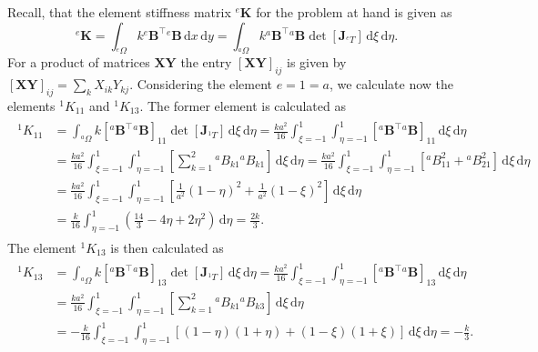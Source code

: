 \documentclass[a4paper,11pt]{article}
\numberwithin{equation}{section}
\newcommand\matr[1]{\ensuremath{\boldsymbol{\mathbf{#1}}}}
\begin{document}
{Recall, that the element stiffness matrix ${}^e \matr{K}$ for the problem at hand is given as \begin{equation}
	{}^e \matr{K} = \int_{{}^e \Omega} k {}^e\matr{B}^\top {}^e \matr{B}\,\mathrm{d}x\,\mathrm{d}y = \int_{{}^a\Omega} k {}^a \matr{B}^\top {}^a\matr{B} \det\left[\matr{J}_{{}^e T}\right]\,\mathrm{d}\xi\,\mathrm{d}\eta.
\end{equation}
For a product of matrices $\matr{X}\matr{Y}$ the entry $[\matr{X}\matr{Y}]_{ij}$ is given by $[\matr{X}\matr{Y}]_{ij} = \sum_k X_{ik}Y_{kj}$. Considering the element $e=1=a$, we calculate now the elements ${}^1 K_{11}$ and ${}^1 K_{13}$. The former element is calculated as \begin{align}
	\begin{aligned}
		{}^1 K_{11} &= \int_{{}^a\Omega}k \left[{}^a \matr{B}^\top {}^a\matr{B}\right]_{11}\det\left[\matr{J}_{{}^1 T}\right]\,\mathrm{d}\xi\,\mathrm{d}\eta = \frac{ka^2}{16}\int_{\xi=-1}^{1}\int_{\eta=-1}^{1}\left[{}^a \matr{B}^\top {}^a\matr{B}\right]_{11}\,\mathrm{d}\xi\,\mathrm{d}\eta \\
		&= \frac{ka^2}{16}\int_{\xi=-1}^{1}\int_{\eta=-1}^{1}\left[\sum_{k=1}^{2} {}^a B_{k1} {}^a B_{k1}\right]\,\mathrm{d}\xi\,\mathrm{d}\eta = \frac{ka^2}{16}\int_{\xi=-1}^{1}\int_{\eta=-1}^{1}\left[{}^a B_{11}^2 + {}^a B_{21}^2\right]\,\mathrm{d}\xi\,\mathrm{d}\eta \\
		&= \frac{ka^2}{16}\int_{\xi=-1}^{1}\int_{\eta=-1}^{1}\left[\frac{1}{a^2}(1-\eta)^2 + \frac{1}{a^2}(1-\xi)^2\right]\,\mathrm{d}\xi\,\mathrm{d}\eta \\
		&= \frac{k}{16}\int_{\eta=-1}^{1}\left(\frac{14}{3}-4\eta + 2\eta^2\right)\,\mathrm{d}\eta = \frac{2k}{3}.
	\end{aligned}
\end{align} The element ${}^1 K_{13}$ is then calculated as \begin{align}
	\begin{aligned}
		{}^1 K_{13} &= \int_{{}^a\Omega}k \left[{}^a \matr{B}^\top {}^a\matr{B}\right]_{13}\det\left[\matr{J}_{{}^1 T}\right]\,\mathrm{d}\xi\,\mathrm{d}\eta = \frac{ka^2}{16}\int_{\xi=-1}^{1}\int_{\eta=-1}^{1}\left[{}^a \matr{B}^\top {}^a\matr{B}\right]_{13}\,\mathrm{d}\xi\,\mathrm{d}\eta \\
		&= \frac{ka^2}{16}\int_{\xi=-1}^{1}\int_{\eta=-1}^{1}\left[\sum_{k=1}^{2} {}^a B_{k1} {}^a B_{k3}\right]\,\mathrm{d}\xi\,\mathrm{d}\eta \\ &= -\frac{k}{16}\int_{\xi=-1}^{1}\int_{\eta=-1}^{1}\left[(1-\eta)(1+\eta)+(1-\xi)(1+\xi)\right]\,\mathrm{d}\xi\,\mathrm{d}\eta = -\frac{k}{3}.

\end{aligned}
\end{align}}
\end{document}
